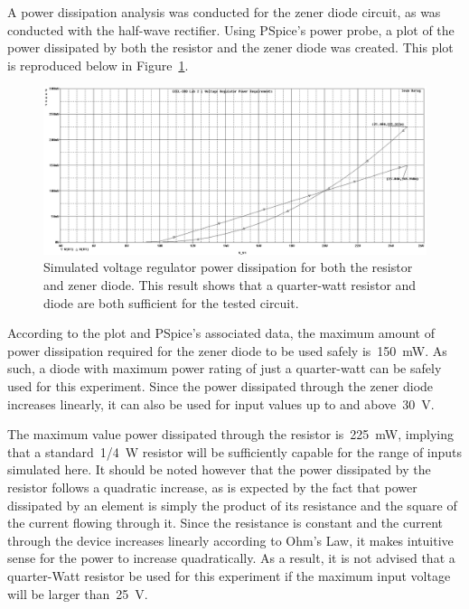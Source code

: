A power dissipation analysis was conducted for the zener diode circuit, as was
conducted with the half-wave rectifier.  Using PSpice's power probe, a plot of
the power dissipated by both the resistor and the zener diode was created.
This plot is reproduced below in Figure~\ref{fig:zenerPlotW}.
%
\begin{figure}[H]
	\centering
	\includegraphics[width=\pwidth]{img/plot/zenerPowerPlot.PNG}
	\parbox{\pwidth}{
	\caption[PSpice Plot --- Voltage Regulator (Power)]{Simulated voltage
		regulator power dissipation for both the resistor and zener diode.
		This result shows that a quarter-watt resistor and diode are both
		sufficient for the tested circuit.}
	\label{fig:zenerPlotW}}
\end{figure}
%
According to the plot and PSpice's associated data, the maximum amount of power
dissipation required for the zener diode to be used safely
is~\SI{150}{\milli\watt}.  As such, a diode with maximum power rating of just a
quarter-watt can be safely used for this experiment.  Since the power
dissipated through the zener diode increases linearly, it can also be used for
input values up to and above~\SI{30}{\volt}.

The maximum value power dissipated through the resistor
is~\SI{225}{\milli\watt}, implying that a standard~\SI{1/4}{\watt} resistor
will be sufficiently capable for the range of inputs simulated here.  It should
be noted however that the power dissipated by the resistor follows a quadratic
increase, as is expected by the fact that power dissipated by an element is
simply the product of its resistance and the square of the current flowing
through it.  Since the resistance is constant and the current through the
device increases linearly according to Ohm's Law, it makes intuitive sense for
the power to increase quadratically.  As a result, it is not advised that a
quarter-Watt resistor be used for this experiment if the maximum input voltage
will be larger than~\SI{25}{\volt}.

